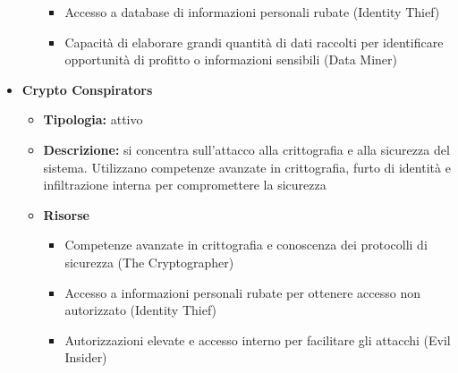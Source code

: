 \begin{itemize}
\begin{itemize}
\begin{itemize}
                            \vspace{3mm}
    
                            \item Accesso a database di informazioni personali rubate (Identity Thief)
    
                            \vspace{3mm}
    
                            \item Capacità di elaborare grandi quantità di dati raccolti per identificare opportunità di profitto o informazioni sensibili (Data Miner)
                        \end{itemize}
                \end{itemize}
    
            \item \textbf{Crypto Conspirators}
                \begin{itemize}
                    \item \textbf{Tipologia:} attivo
    
                    \item \textbf{Descrizione:} si concentra sull'attacco alla crittografia e alla sicurezza del sistema.
                    Utilizzano competenze avanzate in crittografia, furto di identità e infiltrazione interna per compromettere la sicurezza
    
                    \item \textbf{Risorse}
                        \begin{itemize}
                            \item Competenze avanzate in crittografia e conoscenza dei protocolli di sicurezza (The Cryptographer)
                            
                            \vspace{3mm}
    
                            \item Accesso a informazioni personali rubate per ottenere accesso non autorizzato (Identity Thief)
    
                            \vspace{3mm}
    
                            \item Autorizzazioni elevate e accesso interno per facilitare gli attacchi (Evil Insider)
                        \end{itemize}
                \end{itemize}
        \end{itemize}
    
